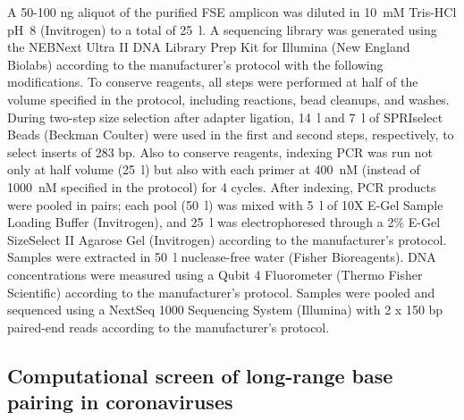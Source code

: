\documentclass[main.tex]{subfiles}
\begin{document}
A 50-100 ng aliquot of the purified FSE amplicon was diluted in 10~mM Tris-HCl pH~8 (Invitrogen) to a total of 25~\textmu l.
A sequencing library was generated using the NEBNext Ultra II DNA Library Prep Kit for Illumina (New England Biolabs) according to the manufacturer's protocol with the following modifications.
To conserve reagents, all steps were performed at half of the volume specified in the protocol, including reactions, bead cleanups, and washes.
During two-step size selection after adapter ligation, 14~\textmu l and 7~\textmu l of SPRIselect Beads (Beckman Coulter) were used in the first and second steps, respectively, to select inserts of 283 bp.
Also to conserve reagents, indexing PCR was run not only at half volume (25~\textmu l) but also with each primer at 400~nM (instead of 1000~nM specified in the protocol) for 4 cycles.
After indexing, PCR products were pooled in pairs; each pool (50~\textmu l) was mixed with 5~\textmu l of 10X E-Gel Sample Loading Buffer (Invitrogen), and 25~\textmu l was electrophoresed through a 2\% E-Gel SizeSelect II Agarose Gel (Invitrogen) according to the manufacturer's protocol.
Samples were extracted in 50~\textmu l nuclease-free water (Fisher Bioreagents).
DNA concentrations were measured using a Qubit 4 Fluorometer (Thermo Fisher Scientific) according to the manufacturer's protocol.
Samples were pooled and sequenced using a NextSeq 1000 Sequencing System (Illumina) with 2 x 150 bp paired-end reads according to the manufacturer's protocol.


\subsection{Computational screen of long-range base pairing in coronaviruses}
\label{screen_lri_comp}
\end{document}
